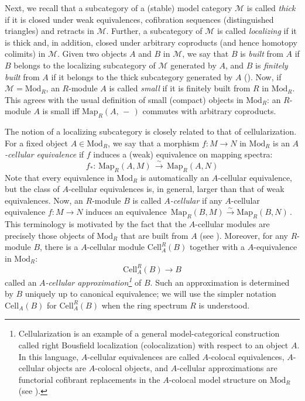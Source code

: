 \documentclass[11pt]{amsart}
\theoremstyle{definition}
\theoremstyle{remark}
\numberwithin{equation}{section}
\newcommand{\la}{\label}
\newcommand{\Map}{\mathrm{Map}}
\newcommand{\Cell}{\mathrm{Cell}}
\def\M{\mathcal{M}}
\def\Mod{\mathrm{Mod}}
\begin{document}
Next, we recall that a subcategory of a (stable) model category $\M$ is called {\it thick} if it is closed under weak equivalences,  cofibration sequences (distinguished triangles) and retracts in $\M$. Further, a subcategory of $ \M $ is called {\it localizing} if it is thick and, in addition, closed under arbitrary coproducts (and hence  homotopy colimits) in $\M$. Given two objects $A$ and $B$ in $ \M$, we say that $B$ is {\it built} from $A$ if $B$ belongs to the localizing subcategory of $ \M $ generated by $A$, and $B$ is {\it finitely built} from $A$ if it belongs to the thick subcategory generated by $A$ (\cite[3.15]{DGI06}). Now, if $ \M = \Mod_R $, an $R$-module $A $ is called {\it small} if it is finitely built from $R$ in $ \Mod_R $. 
This agrees with the usual definition of small (compact) objects in $\Mod_R$: an $R$-module
$A$ is small iff $ \Map_R(A,\,-\,)$ commutes with arbitrary coproducts.

The notion of a localizing subcategory is closely related to that of cellularization. For a fixed object $A \in \Mod_R $, we say that a morphism $ f: M \to N $ in $ \Mod_R $   is an {\it $A$-cellular equivalence} if $f$ induces a (weak) equivalence on mapping spectra:
%
\begin{equation*}
\la{Keq}
f_*:\, \Map_R(A, M)\,\xrightarrow{\sim}\, \Map_R(A, N)
\end{equation*}
%
Note that every equivalence in $\Mod_R$ is automatically an $A$-cellular equivalence, but the class of
$A$-cellular equivalences is, in general, larger than that of weak equivalences.
Now, an $R$-module $B$ is called {\it $A$-cellular} if any $A$-cellular equivalence $ f: M \to N $ induces an equivalence $\,\Map_R(B, M) \xrightarrow{\sim} \Map_R(B, N)\,$. 
This terminology is motivated by the fact that the $A$-cellular modules are precisely those objects of $\Mod_R$ that are built from $A$ (see \cite[5.1.15]{Hir03}). Moreover, for any $R$-module $B$, there is a $A$-cellular module $ \Cell^R_A(B) $  together with a $A$-equivalence in $ \Mod_R$:
%
$$ 
\Cell^R_A(B) \to B 
$$ 
%
called an {\it $A$-cellular approximation\footnote{Cellularization is an example of a general model-categorical construction called right Bousfield localization (colocalization) with respect to an object $A$. In this language, $A$-cellular equivalences are called $A$-colocal equivalences, $A$-cellular objects are $A$-colocal objects,
and $A$-cellular approximations are functorial cofibrant
replacements in the $A$-colocal model structure on $ \Mod_R $ (see \cite[3.1.19]{Hir03}).}} of $B$. Such an approximation is determined by $B$ uniquely up to  canonical equivalence; we will use the simpler notation $ \Cell_A(B) $ for $ \Cell^R_A(B) $ when the ring spectrum $R$ is understood.
\end{document}
